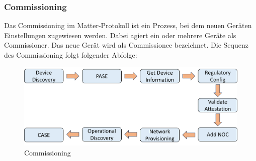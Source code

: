 \documentclass[12pt, a4paper]{article}
\begin{document}
\subsubsection{Commissioning}
\par Das Commissioning im Matter-Protokoll ist ein Prozess, bei dem neuen Geräten Einstellungen zugewiesen werden. Dabei agiert ein oder mehrere Geräte als Commissioner. Das neue Gerät wird als Commissionee bezeichnet. Die Sequenz des Commissioning folgt folgender Abfolge:
\begin{figure}[h]
  \centering
  \includegraphics[scale=0.5]{com}
  \caption{Commissioning}
  \label{Commissioning}
\end{figure}
\end{document}
